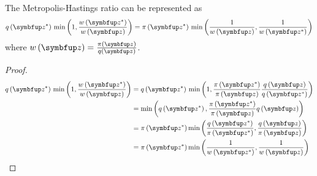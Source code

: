\begin{lemma}\label{thm:mh_ratio}
  The Metropolis-Hastings ratio can be represented as
  \[
  q\left(\vz^*\right)\,\min\left(1, \frac{w\left(\vz^*\right)}{w\left(\vz\right)} \right)
  = \pi\left(\vz^*\right)\,\min\left(\frac{1}{w\left(\vz\right)}, \frac{1}{w\left(\vz^*\right)}\right) 
  \]
  where \(w\left(\vz\right) = \frac{\pi\left(\vz\right)}{q\left(\vz\right)}\).
\end{lemma}
\begin{proof}
  \begin{align}
    q\left(\vz^*\right)\,\min\left(1, \frac{w\left(\vz^*\right)}{w\left(\vz\right)} \right)
    &= q\left(\vz^*\right)\,\min\left(1, \frac{\pi\left(\vz^*\right)}{\pi\left(\vz\right)} \frac{q\left(\vz\right)}{q\left(\vz^*\right)} \right) \\
    &= \min\left(q\left(\vz^*\right), \frac{\pi\left(\vz^*\right)}{\pi\left(\vz\right)} q\left(\vz\right) \right) \\
    &= \pi\left(\vz^*\right) \min\left(\frac{q\left(\vz^*\right)}{\pi\left(\vz^*\right)}, \frac{q\left(\vz\right)}{\pi\left(\vz\right)} \right) \\
    &= \pi\left(\vz^*\right) \min\left(\frac{1}{w\left(\vz^*\right)}, \frac{1}{w\left(\vz\right)} \right)
  \end{align}
\end{proof}

